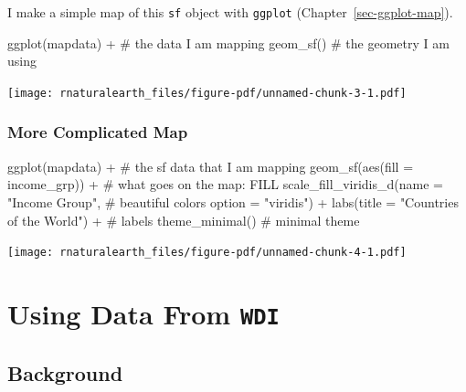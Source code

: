 \documentclass[
  letterpaper,
  DIV=11,
  numbers=noendperiod,
  oneside]{scrreprt}
\newenvironment{Shaded}{\begin{snugshade}}{\end{snugshade}}
\newcommand{\AttributeTok}[1]{\textcolor[rgb]{0.40,0.45,0.13}{#1}}
\newcommand{\CommentTok}[1]{\textcolor[rgb]{0.37,0.37,0.37}{#1}}
\newcommand{\FunctionTok}[1]{\textcolor[rgb]{0.28,0.35,0.67}{#1}}
\newcommand{\NormalTok}[1]{\textcolor[rgb]{0.00,0.23,0.31}{#1}}
\newcommand{\SpecialCharTok}[1]{\textcolor[rgb]{0.37,0.37,0.37}{#1}}
\newcommand{\StringTok}[1]{\textcolor[rgb]{0.13,0.47,0.30}{#1}}
\begin{document}
I make a simple map of this \texttt{sf} object with \texttt{ggplot}
(Chapter~\ref{sec-ggplot-map}).

\begin{Shaded}
\begin{Highlighting}[]
\FunctionTok{ggplot}\NormalTok{(mapdata) }\SpecialCharTok{+} \CommentTok{\# the data I am mapping}
  \FunctionTok{geom\_sf}\NormalTok{() }\CommentTok{\# the geometry I am using}
\end{Highlighting}
\end{Shaded}

\texttt{[image: rnaturalearth\_files/figure-pdf/unnamed-chunk-3-1.pdf]}

\subsection{More Complicated Map}\label{more-complicated-map}

\begin{Shaded}
\begin{Highlighting}[]
\FunctionTok{ggplot}\NormalTok{(mapdata) }\SpecialCharTok{+} \CommentTok{\# the sf data that I am mapping}
  \FunctionTok{geom\_sf}\NormalTok{(}\FunctionTok{aes}\NormalTok{(}\AttributeTok{fill =}\NormalTok{ income\_grp)) }\SpecialCharTok{+} \CommentTok{\# what goes on the map: FILL}
  \FunctionTok{scale\_fill\_viridis\_d}\NormalTok{(}\AttributeTok{name =} \StringTok{"Income Group"}\NormalTok{, }\CommentTok{\# beautiful colors}
                       \AttributeTok{option =} \StringTok{"viridis"}\NormalTok{) }\SpecialCharTok{+}
  \FunctionTok{labs}\NormalTok{(}\AttributeTok{title =} \StringTok{"Countries of the World"}\NormalTok{) }\SpecialCharTok{+} \CommentTok{\# labels}
  \FunctionTok{theme\_minimal}\NormalTok{() }\CommentTok{\# minimal theme}
\end{Highlighting}
\end{Shaded}

\texttt{[image: rnaturalearth\_files/figure-pdf/unnamed-chunk-4-1.pdf]}

\chapter{\texorpdfstring{Using Data From
\texttt{WDI}}{Using Data From WDI}}\label{sec-WDI}

\section{Background}\label{background}
\end{document}
